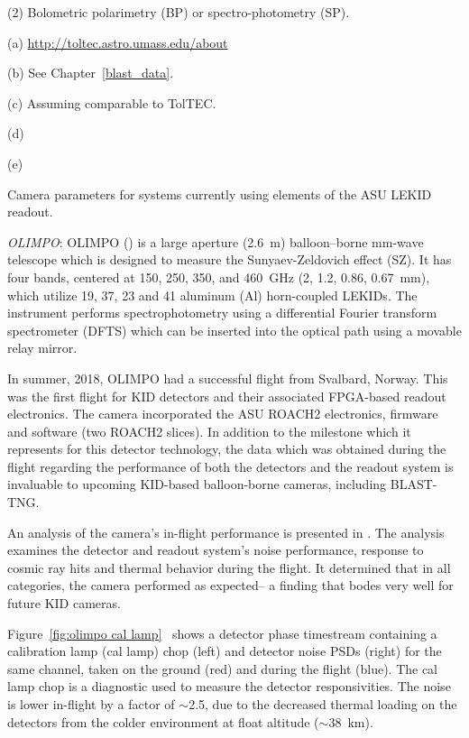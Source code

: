 \begin{table}
\begin{threeparttable}
\begin{tablenotes}
\item (2) Bolometric polarimetry (BP) or spectro-photometry (SP).
\item (a) \url{http://toltec.astro.umass.edu/about}
\item (b) See Chapter~\ref{blast_data}.
\item (c) Assuming comparable to TolTEC\@.
\item (d) \citet{paiella2019kinetic}
\item (e) \citet{mcgeehan2018low}
\end{tablenotes}
\caption{Camera parameters for systems currently using elements of the ASU LEKID readout.}
\label{tab:cameras}
\end{threeparttable}
\end{table}

\vspace{5mm}

\textit{OLIMPO}: OLIMPO (\citet{masi2008olimpo,paiella2019kinetic}) is a large aperture (2.6~m) balloon–borne mm-wave telescope which is designed to measure the Sunyaev-Zeldovich effect (SZ). It has four bands, centered at 150, 250, 350, and 460~GHz (2, 1.2, 0.86, 0.67~mm), which utilize 19, 37, 23 and 41 aluminum (Al) horn-coupled LEKIDs. The instrument performs spectrophotometry using a differential Fourier transform spectrometer (DFTS) which can be inserted into the optical path using a movable relay mirror.

In summer, 2018, OLIMPO had a successful flight from Svalbard, Norway. This was the first flight for KID detectors and their associated FPGA-based readout electronics. The camera incorporated the ASU ROACH2 electronics, firmware and software (two ROACH2 slices). In addition to the milestone which it represents for this detector technology, the data which was obtained during the flight regarding the performance of both the detectors and the readout system is invaluable to upcoming KID-based balloon-borne cameras, including BLAST-TNG\@.

An analysis of the camera's in-flight performance is presented in \citet{masi2019kinetic}. The analysis examines the detector and readout system's noise performance, response to cosmic ray hits and thermal behavior during the flight. It determined that in all categories, the camera performed as expected-- a finding that bodes very well for future KID cameras.

Figure~\ref{fig:olimpo cal lamp}~\citep{masi2019kinetic} shows a detector phase timestream containing a calibration lamp (cal lamp) chop (left) and detector noise PSDs (right) for the same channel, taken on the ground (red) and during the flight (blue). The cal lamp chop is a diagnostic used to measure the detector responsivities. The noise is lower in-flight by a factor of $\sim$2.5, due to the decreased thermal loading on the detectors from the colder environment at float altitude ($\sim$38~km).

